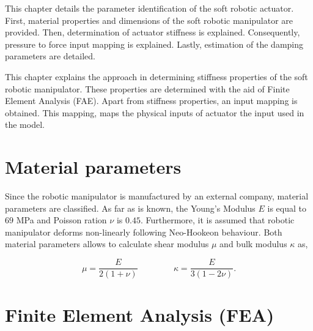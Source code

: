 \label{chap3}

This chapter details the parameter identification of the soft robotic actuator. First, material properties and dimensions of the soft robotic manipulator are provided. Then, determination of actuator stiffness is explained. Consequently, pressure to force input mapping is explained. Lastly, estimation of the damping parameters are detailed.


This chapter explains the approach in determining stiffness properties of the soft robotic manipulator. These properties are determined with the aid of Finite Element Analysis (FAE). Apart from stiffness properties, an input mapping is obtained. This mapping, maps the physical inputs of actuator the input used in the model.

\section{Material parameters}


Since the robotic manipulator is manufactured by an external company, material parameters are classified. As far as is known, the Young's Modulus $E$ is equal to $69$ MPa and Poisson ration $\nu$ is $0.45$. Furthermore, it is assumed that robotic manipulator deforms non-linearly following Neo-Hookeon behaviour. Both material parameters allows to calculate shear modulus $\mu$ and bulk modulus $\kappa$ as,

\begin{equation}
    \mu = \frac{E}{2(1+\nu)}   \hspace{50pt}  \kappa = \frac{E}{3(1-2\nu)}.
\end{equation}




\section{Finite Element Analysis (FEA)}

